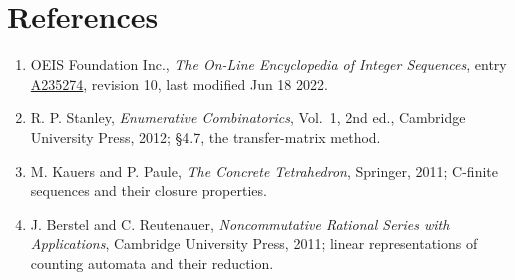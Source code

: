 \documentclass[11pt]{article}
\theoremstyle{definition}
\begin{document}
\section{References}

\begin{enumerate}

\item OEIS Foundation Inc., \emph{The On-Line Encyclopedia of Integer Sequences}, entry \href{https://oeis.org/A235274}{A235274}, revision 10, last modified Jun 18 2022.

\item R. P. Stanley, \emph{Enumerative Combinatorics}, Vol.~1, 2nd ed., Cambridge University Press, 2012; \S4.7, the transfer-matrix method.

\item M. Kauers and P. Paule, \emph{The Concrete Tetrahedron}, Springer, 2011; C-finite sequences and their closure properties.

\item J. Berstel and C. Reutenauer, \emph{Noncommutative Rational Series with Applications}, Cambridge University Press, 2011; linear representations of counting automata and their reduction.

\end{enumerate}
\end{document}
